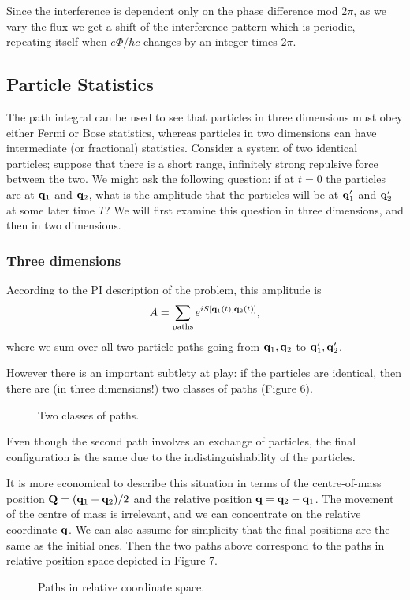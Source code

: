 \documentclass[12pt]{article}
\begin{document}
Since the interference is dependent only on the phase difference mod
$2\pi$, as we vary the flux we get a shift of the interference pattern
which is periodic, repeating itself when $e\Phi/\hbar c$ changes by an
integer times $2\pi$.


\subsection{Particle Statistics}

The path integral can be used to see that particles in three
dimensions
must obey either
Fermi or Bose statistics, whereas particles in two dimensions can
have intermediate (or fractional) statistics. Consider a system of two
identical particles; suppose that there is a short range, infinitely
strong repulsive force between the two. We might ask the following
question: if at $t=0$ the particles are at ${\mathbf q}_1$ and ${\mathbf q}_2$, what
is the amplitude that the particles will be at ${\mathbf q}_1'$ and 
${\mathbf q}_2'$ at some later time $T$? We will first examine this question
in three dimensions, and then in two dimensions.

\subsubsection{Three dimensions}

According to the PI description of the problem, this amplitude is
\[ A=\sum_{\mathrm{paths}}e^{iS[{\mathbf q}_1(t),{\mathbf q}_2(t)]},
\]
where we sum over all two-particle paths going from ${\mathbf q}_1,{\mathbf q}_2$ to
${\mathbf q}_1',{\mathbf q}_2'$.

However there is an important subtlety at play: if the particles are
identical, then there are (in three dimensions!) two classes of paths
(Figure 6).
\begin{figure}[hb]
\epsfysize=4cm
\centerline{}
\caption{Two classes of paths.}
\end{figure}

Even though the second path involves an exchange of particles, the
final configuration is the same due to the indistinguishability of the
particles.

It is more economical to describe this situation in terms of the
centre-of-mass position ${\mathbf Q}=({\mathbf q}_1+{\mathbf q}_2)/2$ and the relative
position ${\mathbf q}={\mathbf q}_2-{\mathbf q}_1$. The movement of the centre of mass is
irrelevant, and we can concentrate on the relative coordinate
${\mathbf q}$. We can also assume for simplicity that the final positions are
the same as the initial ones. Then the two paths above correspond to
the paths in relative position space depicted in Figure 7.
\begin{figure}[hb]
\epsfysize=5cm
\centerline{}
\caption{Paths in relative coordinate space.}
\end{figure}
\end{document}
